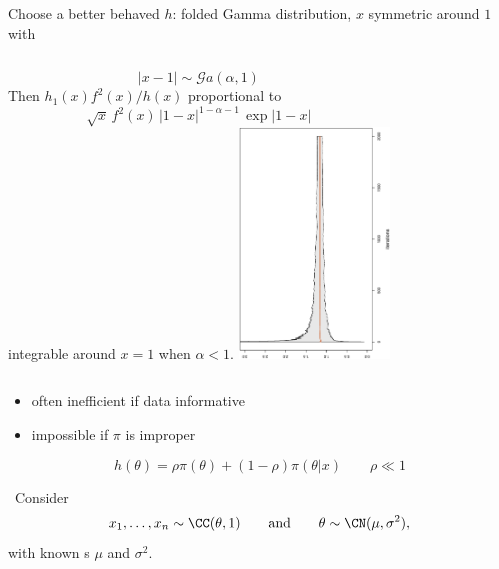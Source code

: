 \begin{slide}
\end{slide}\begin{slide}
Choose a better behaved $h$: \pause
folded Gamma distribution, $x$ symmetric around $1$ with
\begin{columns}
$$
|x-1| \sim\mathcal{G}a(\alpha,1)
$$ 
Then  $h_1(x)f^2(x)/h(x)$ proportional to
$$
\sqrt{x}\,f^2(x)\,|1-x|^{1-\alpha-1}\,\exp|1-x|
$$
integrable around $x=1$ when $\alpha<1$.
\includegraphics[width=4cm,height=\textwidth,angle=270]{figures/student.best.eps}
\end{columns}
\fin

\end{slide}\begin{slide}
{}

\medskip\pause
\begin{itemize}
       \item  often inefficient if data informative
       \item  impossible if $\pi$ is improper
\end{itemize}

\pause\medskip
{}
$$
h(\theta) = \rho \pi(\theta) + (1-\rho) \pi(\theta|x) \qquad \rho\ll 1
$$
\end{slide}\begin{slide}
 \ Consider
$$
  	x_1,\ldots,x_n \sim \CC(\theta,1)
\qquad \text{and} \qquad
	\theta\sim\CN(\mu,\sigma^2),
$$
with known \hypa s $\mu$ and $\sigma^2$.


\end{slide}
